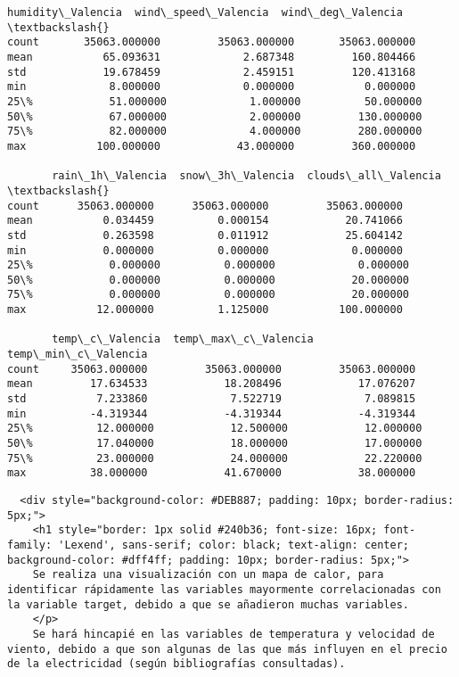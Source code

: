 \documentclass[11pt]{article}
\begin{document}
\begin{tcolorbox}[breakable, size=fbox, boxrule=.5pt, pad at break*=1mm, opacityfill=0]
\begin{Verbatim}[commandchars=\\\{\}]
       humidity\_Valencia  wind\_speed\_Valencia  wind\_deg\_Valencia  \textbackslash{}
count       35063.000000         35063.000000       35063.000000
mean           65.093631             2.687348         160.804466
std            19.678459             2.459151         120.413168
min             8.000000             0.000000           0.000000
25\%            51.000000             1.000000          50.000000
50\%            67.000000             2.000000         130.000000
75\%            82.000000             4.000000         280.000000
max           100.000000            43.000000         360.000000

       rain\_1h\_Valencia  snow\_3h\_Valencia  clouds\_all\_Valencia  \textbackslash{}
count      35063.000000      35063.000000         35063.000000
mean           0.034459          0.000154            20.741066
std            0.263598          0.011912            25.604142
min            0.000000          0.000000             0.000000
25\%            0.000000          0.000000             0.000000
50\%            0.000000          0.000000            20.000000
75\%            0.000000          0.000000            20.000000
max           12.000000          1.125000           100.000000

       temp\_c\_Valencia  temp\_max\_c\_Valencia  temp\_min\_c\_Valencia
count     35063.000000         35063.000000         35063.000000
mean         17.634533            18.208496            17.076207
std           7.233860             7.522719             7.089815
min          -4.319344            -4.319344            -4.319344
25\%          12.000000            12.500000            12.000000
50\%          17.040000            18.000000            17.000000
75\%          23.000000            24.000000            22.220000
max          38.000000            41.670000            38.000000
\end{Verbatim}
\end{tcolorbox}
        
    \begin{verbatim}
  <div style="background-color: #DEB887; padding: 10px; border-radius: 5px;">
    <h1 style="border: 1px solid #240b36; font-size: 16px; font-family: 'Lexend', sans-serif; color: black; text-align: center; background-color: #dff4ff; padding: 10px; border-radius: 5px;">
    Se realiza una visualización con un mapa de calor, para identificar rápidamente las variables mayormente correlacionadas con la variable target, debido a que se añadieron muchas variables.
    </p>
    Se hará hincapié en las variables de temperatura y velocidad de viento, debido a que son algunas de las que más influyen en el precio de la electricidad (según bibliografías consultadas).
\end{verbatim}
\end{document}
